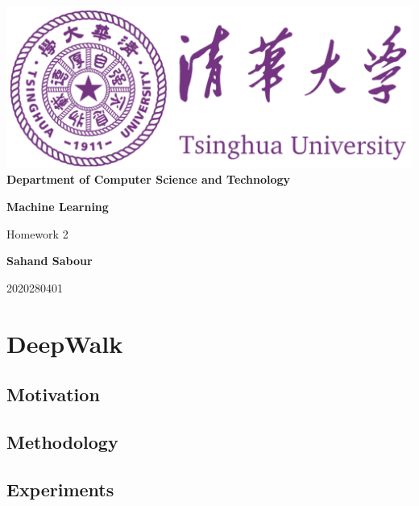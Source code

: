 \documentclass[12pt,a4paper]{article}
\begin{document}
	\begin{titlepage}
		\begin{center}
			\includegraphics[scale=.4]{Figures/Cover}\\
			\vspace{1cm}
			\bf{ \large {Department of Computer Science and Technology} }
		\end{center}
		
		\vspace{4cm}
		\centering
		\textbf{\Huge Machine Learning}
		\vspace{.5cm}
		
		{\Large Homework 2}

		\vspace{4cm}
		
		\textbf{\LARGE Sahand Sabour}
		
		
		
		\vspace{0.5cm}
		
		{\large 2020280401}
		
		
		\vfill
		
	\end{titlepage}

	\section{DeepWalk}
	
	\subsection{Motivation}
	\noindent 
	
	\subsection{Methodology}
	\noindent 
	
	\subsection{Experiments}
	\noindent 
	
\end{document}
